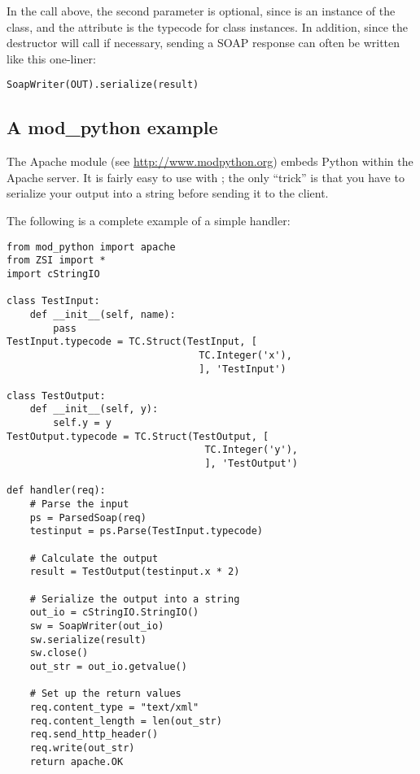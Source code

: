 In the  call above, the second parameter is optional,
since  is an instance of the 
 class, and the  attribute is
the typecode for class instances.
In addition, since the  destructor will call 
if necessary, sending a SOAP response can often be written like
this one-liner:
\begin{verbatim}
SoapWriter(OUT).serialize(result)
\end{verbatim}


\subsection{A mod_python example}

The Apache module  (see
\url{http://www.modpython.org}) embeds Python within the Apache server.
It is fairly easy to use \ZSI{} with ; the only ``trick''
is that you have to serialize your output into a string before
sending it to the client.

The following is a complete example of a simple handler:

\begin{verbatim}
from mod_python import apache
from ZSI import *
import cStringIO

class TestInput:
    def __init__(self, name):
        pass
TestInput.typecode = TC.Struct(TestInput, [
                                 TC.Integer('x'),
                                 ], 'TestInput')

class TestOutput:
    def __init__(self, y):
        self.y = y
TestOutput.typecode = TC.Struct(TestOutput, [
                                  TC.Integer('y'),
                                  ], 'TestOutput')

def handler(req):
    # Parse the input
    ps = ParsedSoap(req)
    testinput = ps.Parse(TestInput.typecode)

    # Calculate the output
    result = TestOutput(testinput.x * 2)

    # Serialize the output into a string
    out_io = cStringIO.StringIO()
    sw = SoapWriter(out_io)
    sw.serialize(result)
    sw.close()
    out_str = out_io.getvalue()

    # Set up the return values
    req.content_type = "text/xml"
    req.content_length = len(out_str)
    req.send_http_header()
    req.write(out_str)
    return apache.OK
\end{verbatim}


